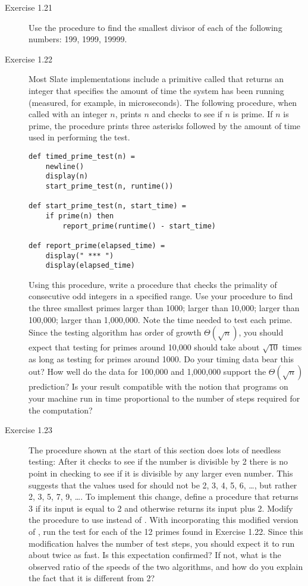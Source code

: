 \begin{description}
\item[Exercise 1.21] Use the  procedure to find the smallest divisor of each of the following numbers: 199, 1999, 19999.

\item[Exercise 1.22] Most Slate implementations include a primitive called  that returns an integer that specifies the amount of time the system has been running (measured, for example, in microseconds). The following  procedure, when called with an integer $n$, prints $n$ and checks to see if $n$ is prime. If $n$ is prime, the procedure prints three asterisks followed by the amount of time used in performing the test.

\begin{lstlisting}
def timed_prime_test(n) =
    newline()
    display(n)
    start_prime_test(n, runtime())

def start_prime_test(n, start_time) =
    if prime(n) then
        report_prime(runtime() - start_time)

def report_prime(elapsed_time) =
    display(" *** ")
    display(elapsed_time)
\end{lstlisting}

Using this procedure, write a procedure  that checks the primality of consecutive odd integers in a specified range. Use your procedure to find the three smallest primes larger than 1000; larger than 10,000; larger than 100,000; larger than 1,000,000. Note the time needed to test each prime. Since the testing algorithm has order of growth $\Theta(\sqrt{n})$, you should expect that testing for primes around 10,000 should take about $\sqrt{10}$ times as long as testing for primes around 1000. Do your timing data bear this out? How well do the data for 100,000 and 1,000,000 support the $\Theta(\sqrt{n})$ prediction? Is your result compatible with the notion that programs on your machine run in time proportional to the number of steps required for the computation?

\item[Exercise 1.23] The  procedure shown at the start of this section does lots of needless testing: After it checks to see if the number is divisible by 2 there is no point in checking to see if it is divisible by any larger even number. This suggests that the values used for  should not be 2, 3, 4, 5, 6, \ldots, but rather 2, 3, 5, 7, 9, \ldots. To implement this change, define a procedure  that returns 3 if its input is equal to 2 and otherwise returns its input plus 2. Modify the  procedure to use  instead of . With  incorporating this modified version of , run the test for each of the 12 primes found in Exercise 1.22. Since this modification halves the number of test steps, you should expect it to run about twice as fast. Is this expectation confirmed? If not, what is the observed ratio of the speeds of the two algorithms, and how do you explain the fact that it is different from 2?


\end{description}
